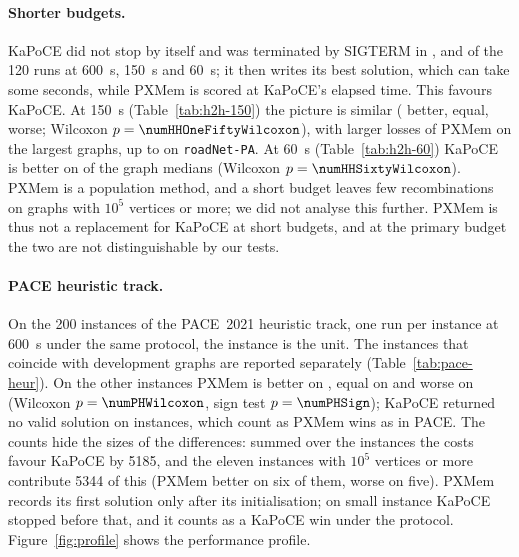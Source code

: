\paragraph{Shorter budgets.}  KaPoCE did not stop by itself and was
terminated by SIGTERM in \numHHSixSigterm{}, \numHHOneFiftySigterm{} and
\numHHSixtySigterm{} of the 120 runs at \SI{600}{s}, \SI{150}{s} and
\SI{60}{s}; it then writes its best solution, which can take some seconds,
while PXMem is scored at KaPoCE's elapsed time.  This favours KaPoCE.  At
\SI{150}{s} (Table~\ref{tab:h2h-150}) the picture is similar (\numHHOneFiftyBetter{} better, \numHHOneFiftyEqual{}
equal, \numHHOneFiftyWorse{} worse; Wilcoxon $p=\numHHOneFiftyWilcoxon$),
with larger losses of PXMem on the largest graphs, up to
\numHHOneFiftyMaxAbs{} on \texttt{roadNet-PA}.  At \SI{60}{s}
(Table~\ref{tab:h2h-60}) KaPoCE is better on \numHHSixtyWorse{} of the
\numHHSixtyGraphs{} graph medians (Wilcoxon $p=\numHHSixtyWilcoxon$).  PXMem is
a population method, and a short budget leaves few recombinations on graphs
with $10^5$ vertices or more; we did not analyse this further.  PXMem is thus
not a replacement for KaPoCE at short budgets, and at the primary budget the
two are not distinguishable by our tests.

\paragraph{PACE heuristic track.}  On the 200 instances of the PACE~2021
heuristic track, one run per instance at \SI{600}{s} under the same protocol,
the instance is the unit.  The \numPDn{} instances that coincide with
development graphs are reported separately (Table~\ref{tab:pace-heur}).  On
the other \numPHn{} instances PXMem is better on \numPHBetter{}, equal on
\numPHEqual{} and worse on \numPHWorse{} (Wilcoxon $p=\numPHWilcoxon$, sign
test $p=\numPHSign$); KaPoCE returned no valid solution on
\numPHKapoceInvalid{} instances, which count as PXMem wins as in PACE.
The counts hide the sizes of the differences: summed over the \numPHn{}
instances the costs favour KaPoCE by 5185, and the eleven instances with
$10^5$ vertices or more contribute 5344 of this (PXMem better on six of
them, worse on five).
PXMem records its first solution only after its initialisation; on
\numPHNoSolution{} small instance KaPoCE stopped before that, and it
counts as a KaPoCE win under the protocol.
Figure~\ref{fig:profile} shows the performance profile.

\begin{table}[!tbp]
\centering
\caption{PACE~2021 heuristic track, $T=\SI{600}{s}$, one run per instance:
PXMem against KaPoCE by instance size.  W/T/L: instances on which PXMem is
better, equal, worse; $\sum$: total difference of the costs; median: of the
relative differences in percent.}
\label{tab:pace-heur}
\footnotesize

\end{table}

